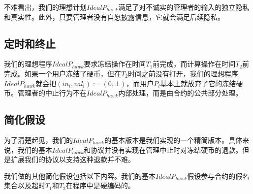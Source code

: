 \documentclass{xduugtrans}
\begin{document}
不难看出，我们的理想计划$IdealP_{hawk}$满足了对不诚实的管理者的输入的独立隐私和真实性。此外，只要管理者没有自愿披露信息，它就会满足后续隐私。

\subsection{定时和终止}

我们的理想程序$IdealP_{hawk}$要求冻结操作在时间$T_1$前完成，而计算操作在时间$T_2$前完成。如果一个用户冻结了硬币，但在$T_2$时间之前没有打开，我们的理想程序$IdealP_{hawk}$就会把$(in_i,val_i) := (0,⊥)$，而用户$P_i$基本上就放弃了它的冻结硬币。管理者的中止行为不在$IdealP_{hawk}$内部处理，而是由合约的公共部分处理。

\subsection{简化假设}

为了清楚起见，我们的$IdealP_{hawk}$的基本版本是我们实现的一个精简版本。具体来说，我们的基本$IdealP_{hawk}$和协议并没有实现在管理中止时对冻结硬币的退款。但是扩展我们的协议以支持这种退款并不难。

我们做的其他简化假设包括以下内容。我们的基本$IdealP_{hawk}$假设参与合约的假名集合以及超时$T_1$和$T_2$在程序中是硬编码的。
\end{document}
